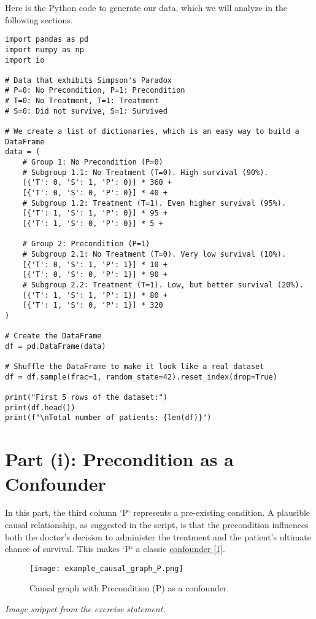 \documentclass[11pt,a4paper]{article}
\begin{document}
Here is the Python code to generate our data, which we will analyze in the following sections.
\begin{lstlisting}[caption={Python code to generate a DataFrame exhibiting Simpson's Paradox.}, label={lst:data_gen}]
import pandas as pd
import numpy as np
import io

# Data that exhibits Simpson's Paradox
# P=0: No Precondition, P=1: Precondition
# T=0: No Treatment, T=1: Treatment
# S=0: Did not survive, S=1: Survived

# We create a list of dictionaries, which is an easy way to build a DataFrame
data = (
    # Group 1: No Precondition (P=0)
    # Subgroup 1.1: No Treatment (T=0). High survival (90%).
    [{'T': 0, 'S': 1, 'P': 0}] * 360 +
    [{'T': 0, 'S': 0, 'P': 0}] * 40 +
    # Subgroup 1.2: Treatment (T=1). Even higher survival (95%).
    [{'T': 1, 'S': 1, 'P': 0}] * 95 +
    [{'T': 1, 'S': 0, 'P': 0}] * 5 +

    # Group 2: Precondition (P=1)
    # Subgroup 2.1: No Treatment (T=0). Very low survival (10%).
    [{'T': 0, 'S': 1, 'P': 1}] * 10 +
    [{'T': 0, 'S': 0, 'P': 1}] * 90 +
    # Subgroup 2.2: Treatment (T=1). Low, but better survival (20%).
    [{'T': 1, 'S': 1, 'P': 1}] * 80 +
    [{'T': 1, 'S': 0, 'P': 1}] * 320
)

# Create the DataFrame
df = pd.DataFrame(data)

# Shuffle the DataFrame to make it look like a real dataset
df = df.sample(frac=1, random_state=42).reset_index(drop=True)

print("First 5 rows of the dataset:")
print(df.head())
print(f"\nTotal number of patients: {len(df)}")
\end{lstlisting}

\section{Part (i): Precondition as a Confounder}

In this part, the third column `P` represents a pre-existing condition. A plausible causal relationship, as suggested in the script, is that the precondition influences both the doctor's decision to administer the treatment and the patient's ultimate chance of survival. This makes `P` a classic \hyperref[sec:confounding]{confounder [1]}.

\begin{figure}[H]
    \centering
    \texttt{[image: example\_causal\_graph\_P.png]}
    \caption{Causal graph with Precondition (P) as a confounder.}
    \label{fig:confounder_graph}
\end{figure}
\textit{Image snippet from the exercise statement.}
\end{document}
